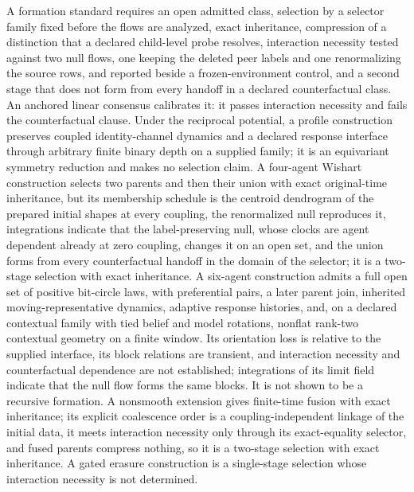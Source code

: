 A formation standard requires an open admitted class, selection by a selector family fixed before the flows are analyzed, exact inheritance, compression of a distinction that a declared child-level probe resolves, interaction necessity tested against two null flows, one keeping the deleted peer labels and one renormalizing the source rows, and reported beside a frozen-environment control, and a second stage that does not form from every handoff in a declared counterfactual class. An anchored linear consensus calibrates it: it passes interaction necessity and fails the counterfactual clause. Under the reciprocal potential, a profile construction preserves coupled identity-channel dynamics and a declared response interface through arbitrary finite binary depth on a supplied family; it is an equivariant symmetry reduction and makes no selection claim. A four-agent Wishart construction selects two parents and then their union with exact original-time inheritance, but its membership schedule is the centroid dendrogram of the prepared initial shapes at every coupling, the renormalized null reproduces it, integrations indicate that the label-preserving null, whose clocks are agent dependent already at zero coupling, changes it on an open set, and the union forms from every counterfactual handoff in the domain of the selector; it is a two-stage selection with exact inheritance. A six-agent construction admits a full open set of positive bit-circle laws, with preferential pairs, a later parent join, inherited moving-representative dynamics, adaptive response histories, and, on a declared contextual family with tied belief and model rotations, nonflat rank-two contextual geometry on a finite window. Its orientation loss is relative to the supplied interface, its block relations are transient, and interaction necessity and counterfactual dependence are not established; integrations of its limit field indicate that the null flow forms the same blocks. It is not shown to be a recursive formation. A nonsmooth extension gives finite-time fusion with exact inheritance; its explicit coalescence order is a coupling-independent linkage of the initial data, it meets interaction necessity only through its exact-equality selector, and fused parents compress nothing, so it is a two-stage selection with exact inheritance. A gated erasure construction is a single-stage selection whose interaction necessity is not determined.

